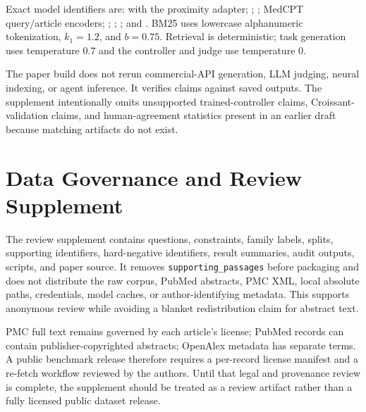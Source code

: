 \documentclass{article}
\begin{document}
Exact model identifiers are:  with the  proximity adapter; ; ; MedCPT query/article encoders; ; ; ; and . BM25 uses lowercase alphanumeric tokenization, $k_1{=}1.2$, and $b{=}0.75$. Retrieval is deterministic; task generation uses temperature 0.7 and the controller and judge use temperature 0.

The paper build does not rerun commercial-API generation, LLM judging, neural indexing, or agent inference. It verifies claims against saved outputs. The supplement intentionally omits unsupported trained-controller claims, Croissant-validation claims, and human-agreement statistics present in an earlier draft because matching artifacts do not exist.

\section{Data Governance and Review Supplement}
\label{app:governance}

The review supplement contains questions, constraints, family labels, splits, supporting identifiers, hard-negative identifiers, result summaries, audit outputs, scripts, and paper source. It removes \texttt{supporting\_passages} before packaging and does not distribute the raw corpus, PubMed abstracts, PMC XML, local absolute paths, credentials, model caches, or author-identifying metadata. This supports anonymous review while avoiding a blanket redistribution claim for abstract text.

PMC full text remains governed by each article's license; PubMed records can contain publisher-copyrighted abstracts; OpenAlex metadata has separate terms. A public benchmark release therefore requires a per-record license manifest and a re-fetch workflow reviewed by the authors. Until that legal and provenance review is complete, the supplement should be treated as a review artifact rather than a fully licensed public dataset release.
\end{document}
